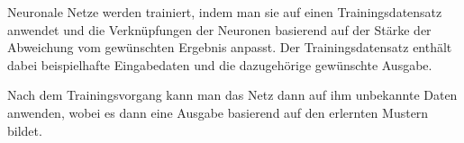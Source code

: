 \bigbreak\noindent
Neuronale Netze werden trainiert, indem man sie auf einen Trainingsdatensatz anwendet und die Verknüpfungen der Neuronen basierend auf der Stärke der Abweichung vom gewünschten Ergebnis anpasst.
Der Trainingsdatensatz enthält dabei beispielhafte Eingabedaten und die dazugehörige gewünschte Ausgabe. \cite{CA18}

\bigbreak\noindent
Nach dem Trainingsvorgang kann man das Netz dann auf ihm unbekannte Daten anwenden, wobei es dann eine Ausgabe basierend auf den erlernten Mustern bildet. \cite{CA18}